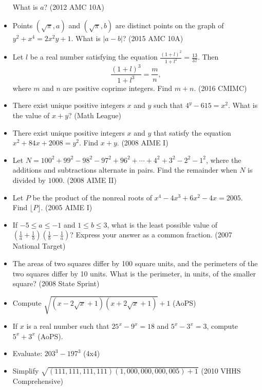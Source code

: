 \documentclass{article}
\begin{document}
\begin{itemize}
What is $a$? (2012 AMC 10A)

\item Points $( \sqrt{\pi} , a)$ and $( \sqrt{\pi} , b)$ are distinct points on the graph of $y^2 + x^4 = 2x^2 y + 1$. What is $|a-b|$? (2015 AMC 10A)

\item Let $l$ be a real number satisfying the equation $\frac{(1+l)^2}{1+l^2}=\frac{13}{37}$. Then $$\frac{(1+l)^3}{1+l^3}=\frac{m}{n},$$ where $m$ and $n$ are positive coprime integers. Find $m+n$. (2016 CMIMC)

\item There exist unique positive integers $x$ and $y$ such that $4^y-615=x^2$. What is the value of $x+y$? (Math League)

\item There exist unique positive integers $x$ and $y$ that satisfy the equation $x^2 + 84x + 2008 = y^2$. Find $x + y$. (2008 AIME I)

\item Let $N = 100^2 + 99^2 - 98^2 - 97^2 + 96^2 + \cdots + 4^2 + 3^2 - 2^2 - 1^2$, where the additions and subtractions alternate in pairs. Find the remainder when $N$ is divided by $1000$. (2008 AIME II)

\item Let $P$ be the product of the nonreal roots of $x^4-4x^3+6x^2-4x=2005$. Find $\lfloor P\rfloor$. (2005 AIME I)

\item If $-5\le a\le -1$ and $1\le b\le 3$, what is the least possible value of $\left( \frac{1}{a}+\frac{1}{b}\right) \left(\frac{1}{b}-\frac{1}{a}\right)$? Express your answer as a common fraction. (2007 National Target)

\item The areas of two squares differ by 100 square units, and the perimeters of the two squares differ by 10 units. What is the perimeter, in units, of the smaller square? (2008 State Sprint)

\item Compute $\sqrt{(x-2\sqrt{x}+1)(x+2\sqrt{x}+1)} + 1$ (AoPS)

\item If $x$ is a real number such that $25^x-9^x=18$ and $5^x-3^x=3$, compute $5^x+3^x$ (AoPS).

\item Evaluate: $203^3-197^3$ (4x4)

\item Simplify $\sqrt{(111,111,111,111)(1,000,000,000,005)+1}$ (2010 VHHS Comprehensive)


\end{itemize}
\end{document}
